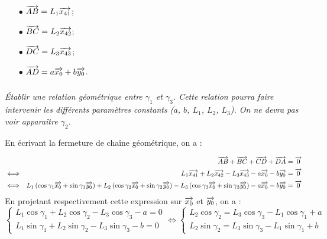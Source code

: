 \documentclass[10pt,fleqn]{article} %
\begin{document}
\begin{multicols}{2}
\begin{multicols}{2}
\begin{minipage}[c]{.45\linewidth}
\begin{itemize}
\item [$\bullet$] $\overrightarrow{AB}=L_1\overrightarrow{x_{41}}$;
\item [$\bullet$] $\overrightarrow{BC}=L_2\overrightarrow{x_{42}}$;
\end{itemize}
\end{minipage}\hfill
\begin{minipage}[c]{.45\linewidth}
\begin{itemize}
\item [$\bullet$] $\overrightarrow{DC}=L_3\overrightarrow{x_{43}}$;
\item [$\bullet$] $\overrightarrow{AD}=a\overrightarrow{x_{0}}+b\overrightarrow{y_{0}}$.
\end{itemize}
\end{minipage}

\fi
\subparagraph{}
\textit{Établir une relation géométrique entre $\gamma_1$ et $\gamma_3$. Cette relation pourra faire intervenir les différents paramètres constants ($a$, $b$, $L_1$, $L_2$, $L_3$). On ne devra pas voir apparaître $\gamma_2$.}

\ifprof
\begin{corrige}
En écrivant la fermeture de chaîne géométrique, on a : 

\begin{eqnarray*}
&& \overrightarrow{AB}+\overrightarrow{BC}+\overrightarrow{CD} + \overrightarrow{DA} = \overrightarrow{0} \\
& \Longleftrightarrow& L_1\overrightarrow{x_{41}} + L_2\overrightarrow{x_{42}} - L_3\overrightarrow{x_{43}}
- a\overrightarrow{x_{0}}-b\overrightarrow{y_{0}} = \overrightarrow{0}\\
& \Longleftrightarrow&  
L_1\left(\cos\gamma_{1}\overrightarrow{x_0}+ \sin\gamma_{1}\overrightarrow{y_0}\right) + L_2\left(\cos\gamma_{2}\overrightarrow{x_0}+ \sin\gamma_{2}\overrightarrow{y_0}\right)
-L_3\left(\cos\gamma_{3}\overrightarrow{x_0}+ \sin\gamma_{3}\overrightarrow{y_0}\right)
- a\overrightarrow{x_{0}}-b\overrightarrow{y_{0}} = \overrightarrow{0}\\
\end{eqnarray*}
En projetant respectivement cette expression sur $\overrightarrow{x_0}$ et $\overrightarrow{y_0}$, on a : 
$$
\left\{
\begin{array}{l}
L_1 \cos\gamma_{1} + L_2 \cos\gamma_{2} 
-L_3\cos\gamma_{3} - a= 0\\
L_1 \sin\gamma_{1} + L_2 \sin\gamma_{2}
-L_3 \sin\gamma_{3} -b=0
\end{array}
\right.
\Longleftrightarrow
\left\{
\begin{array}{l}
L_2 \cos\gamma_{2} =L_3\cos\gamma_{3}- L_1 \cos\gamma_{1} + a  \\
L_2 \sin\gamma_{2} = L_3 \sin\gamma_{3}-L_1 \sin\gamma_{1} + b
\end{array}
\right.
$$


\end{corrige}
\end{multicols}
\end{multicols}
\end{document}
